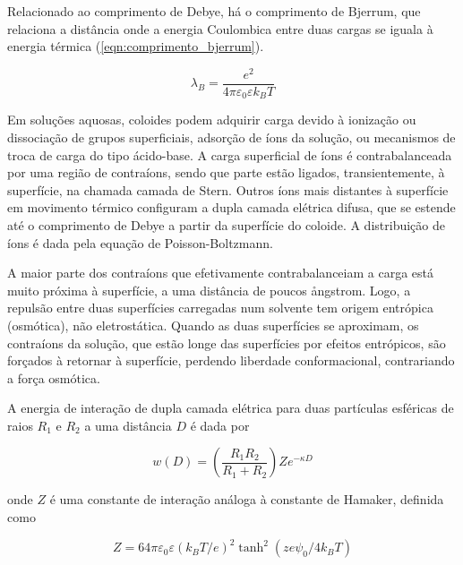 	Relacionado ao comprimento de Debye, há o comprimento de Bjerrum, que relaciona a distância onde a energia Coulombica entre duas cargas se iguala à energia térmica (\autoref{eqn:comprimento_bjerrum}).
	
	\begin{equation}
		\lambda_B = \dfrac{e^2}{4 \pi \varepsilon_{ 0 } \varepsilon k_BT}
		\label{eqn:comprimento_bjerrum}
	\end{equation} 
	
	Em soluções aquosas, coloides podem adquirir carga devido à ionização ou dissociação de grupos superficiais, adsorção de íons da solução, ou mecanismos de troca de carga do tipo ácido-base. A carga superficial de íons é contrabalanceada por uma região de contraíons, sendo que parte estão ligados, transientemente, à superfície, na chamada camada de Stern.  Outros íons mais distantes à superfície em movimento térmico configuram a dupla camada elétrica difusa, que se estende até o comprimento de Debye a partir da superfície do coloide. A distribuição de íons é dada pela equação de Poisson-Boltzmann.
	
	A maior parte dos contraíons que efetivamente contrabalanceiam a carga está muito próxima à superfície, a uma distância de poucos \aa ngstrom. Logo, a repulsão entre duas superfícies carregadas num solvente tem origem entrópica (osmótica), não eletrostática. Quando as duas superfícies se aproximam, os contraíons da solução, que estão longe das superfícies por efeitos entrópicos, são forçados à retornar à superfície, perdendo liberdade conformacional, contrariando a força osmótica.
	
	A energia de interação de dupla camada elétrica para duas partículas esféricas de raios \(R_1\) e \(R_2\) a uma distância \(D\) é dada por
	
	\begin{equation}
		w(D) = \left(  \dfrac{R_1R_2}{R_1+R_2}  \right)Ze^{-\kappa D}
		\label{eqn:dupla_camada_esferas}
	\end{equation} 
	
	\noindent onde \(Z\) é uma constante de interação análoga à constante de Hamaker, definida como 
	
	\begin{equation}
		Z = 64 \pi \varepsilon _ { 0 } \varepsilon ( k_B T / e ) ^ { 2 } \tanh ^ { 2 } \left( z e \psi _ { 0 } / 4 k_B T \right)
		\label{eqn:constante_interacao_Z}
	\end{equation} 
	

